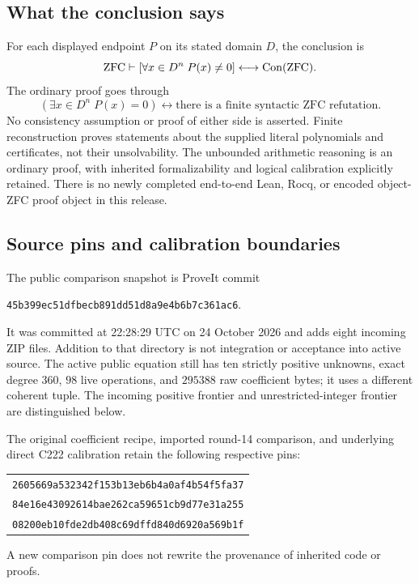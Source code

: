 \subsection{What the conclusion says}
For each displayed endpoint $P$ on its stated domain $D$, the conclusion is
\[
 \mathrm{ZFC}\vdash
 \left[\forall x\in D^n\;P(x)\ne0\right]
 \longleftrightarrow\operatorname{Con}(\mathrm{ZFC}).
\]
The ordinary proof goes through
\[
 (\exists x\in D^n\;P(x)=0)
 \longleftrightarrow
 \text{there is a finite syntactic ZFC refutation}.
\]
No consistency assumption or proof of either side is asserted. Finite reconstruction proves statements about the supplied literal polynomials and certificates, not their unsolvability. The unbounded arithmetic reasoning is an ordinary proof, with inherited formalizability and logical calibration explicitly retained. There is no newly completed end-to-end Lean, Rocq, or encoded object-ZFC proof object in this release.

\subsection{Source pins and calibration boundaries}
The public comparison snapshot is ProveIt commit
\begin{center}\small\texttt{45b399ec51dfbecb891dd51d8a9e4b6b7c361ac6}.\end{center}
It was committed at 22:28:29 UTC on 24 October 2026 and adds eight incoming ZIP files. Addition to that directory is not integration or acceptance into active source. The active public equation still has ten strictly positive unknowns, exact degree $360$, $98$ live operations, and $295388$ raw coefficient bytes; it uses a different coherent tuple. The incoming positive frontier and unrestricted-integer frontier are distinguished below.

The original coefficient recipe, imported round-14 comparison, and underlying direct C222 calibration retain the following respective pins:
\begin{center}\small\begin{tabular}{l}\texttt{2605669a532342f153b13eb6b4a0af4b54f5fa37}\\
\texttt{84e16e43092614bae262ca59651cb9d77e31a255}\\
\texttt{08200eb10fde2db408c69dffd840d6920a569b1f}\end{tabular}\end{center} A new comparison pin does not rewrite the provenance of inherited code or proofs.

